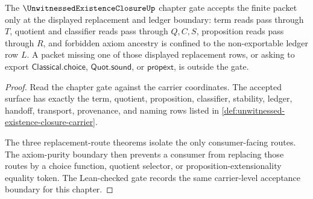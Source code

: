 \begin{theorem}
\label{thm:unwitnessed-existence-closure-tastegate-boundary}
The $\UnwitnessedExistenceClosureUp$ chapter gate accepts the finite packet only at the displayed replacement and ledger boundary: term reads pass through $T$, quotient and classifier reads pass through $Q,C,S$, proposition reads pass through $R$, and forbidden axiom ancestry is confined to the non-exportable ledger row $L$. A packet missing one of those displayed replacement rows, or asking to export $\mathsf{Classical.choice}$, $\mathsf{Quot.sound}$, or $\mathsf{propext}$, is outside the gate.
\end{theorem}
\begin{proof}
Read the chapter gate against the carrier coordinates. The accepted surface has exactly the term, quotient, proposition, classifier, stability, ledger, handoff, transport, provenance, and naming rows listed in \autoref{def:unwitnessed-existence-closure-carrier}.

The three replacement-route theorems isolate the only consumer-facing routes. The axiom-purity boundary then prevents a consumer from replacing those routes by a choice function, quotient selector, or proposition-extensionality equality token. The Lean-checked gate records the same carrier-level acceptance boundary for this chapter.
\end{proof}

